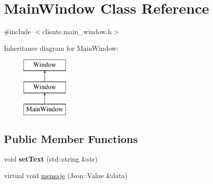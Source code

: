 \hypertarget{classMainWindow}{\section{Main\-Window Class Reference}
\label{classMainWindow}
}


{\ttfamily \#include $<$cliente.\-main\-\_\-window.\-h$>$}

Inheritance diagram for Main\-Window\-:\begin{figure}[H]
\begin{center}
\leavevmode
\includegraphics[height=3.000000cm]{classMainWindow}
\end{center}
\end{figure}
\subsection*{Public Member Functions}
\begin{DoxyCompactItemize}
\item 
\hypertarget{classMainWindow_a5a199f2a565bea157bf757965231009b}{void {\bfseries set\-Text} (std\-::string \&str)}\label{classMainWindow_a5a199f2a565bea157bf757965231009b}

\item 
virtual void \hyperlink{classMainWindow_a735c7caa0682694dc016f8bb80ef1f8c}{mensaje} (Json\-::\-Value \&data)
\end{DoxyCompactItemize}
